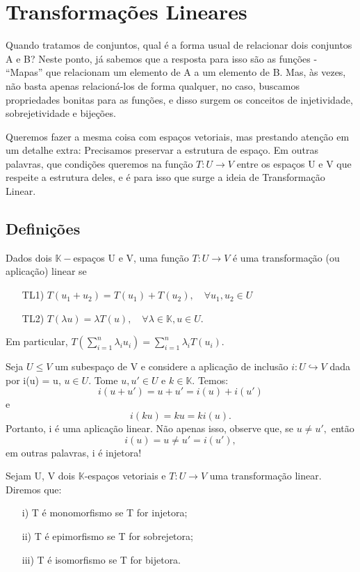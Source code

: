 \section{Transforma\c c\~oes Lineares}
Quando tratamos de conjuntos, qual \'e a forma usual de relacionar dois conjuntos A e B? Neste ponto, j\'a sabemos que a resposta para
isso s\~ao as fun\c c\~oes - ``Mapas'' que relacionam um elemento de A a um elemento de B. Mas, \`as vezes, n\~ao basta apenas relacion\'a-los de forma qualquer, no caso, buscamos propriedades bonitas para as fun\c c\~oes, e disso surgem os conceitos de injetividade,
sobrejetividade e bije\c c\~oes.

Queremos fazer a mesma coisa com espa\c cos vetoriais, mas prestando aten\c c\~ao em um detalhe extra: Precisamos 
preservar a estrutura de espa\c co. Em outras palavras, que condi\c c\~oes queremos na fun\c c\~ao $T:U\rightarrow{V}$ 
entre os espa\c cos U e V que respeite a estrutura deles, e \'e para isso que surge a ideia de Transforma\c c\~ao 
Linear.

\subsection{Defini\c c\~oes}

\begin{def*}
    Dados dois $\mathbb{K}-$espa\c cos U e V, uma fun\c c\~ao $T:U\rightarrow{V}$ \'e uma transforma\c c\~ao (ou aplica\c c\~ao) linear
se
    \begin{itemize}
        \item [TL1)] $T(u_1 + u_2) = T(u_1) + T(u_2), \quad\forall u_1, u_2\in{U}$ \label{TL1}
        \item [TL2)] $T(\lambda u) = \lambda{T(u)}, \quad\forall\lambda\in{\mathbb{K}}, u\in{U}.$ \label{TL2}
    \end{itemize}
\end{def*}

Em particular, $T(\sum_{i=1}^{n}\lambda_iu_i) = \sum_{i=1}^{n}\lambda_iT(u_i).$
\begin{example}[Inj]
    Seja $U\leq{V}$ um subespa\c co de V e considere a aplica\c c\~ao de inclus\~ao $i:U\hookrightarrow V$ dada por 
i(u) = u, $u\in{U}$. Tome $u, u'\in{U}$ e $k\in\mathbb{K}$. Temos:
$$
    i(u + u') = u + u' = i(u) + i(u')
$$
e
$$
    i(ku) = ku = ki(u).
$$
Portanto, i \'e uma aplica\c c\~ao linear. N\~ao apenas isso, observe que, se $u\neq{u'},$ ent\~ao 
$$
    i(u) = u \neq u' = i(u'),
$$
em outras palavras, i \'e injetora! 
\qedsymbol
\end{example}
\begin{def*}
    Sejam U, V dois $\mathbb{K}$-espa\c cos vetoriais e $T: U\rightarrow V$ uma transforma\c c\~ao linear. Diremos
que:
\begin{itemize}
    \item [i)] T \'e monomorfismo se T for injetora; \label{MONO}
    \item [ii)] T \'e epimorfismo se T for sobrejetora; \label{EPIM}
    \item [iii)] T \'e isomorfismo se T for bijetora. \label{ISO}
\end{itemize}
\end{def*}


